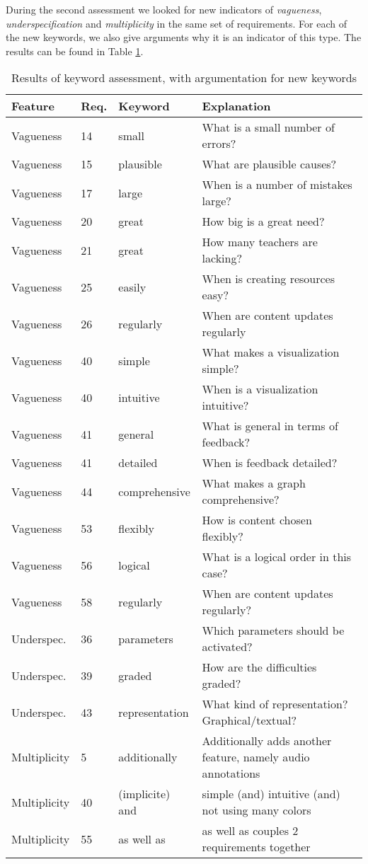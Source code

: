 \documentclass[a4paper,11pt]{article}
\begin{document}
			During the second assessment we looked for new indicators of \textit{vagueness}, \textit{underspecification} and \textit{multiplicity} in the same set of requirements. For each of the new keywords, we also give arguments why it is an indicator of this type. The results can be found in Table \ref{table:keywords2}. \\
			
			\begin{table}[h!]
				\begin{tabular}{l | l | l | p{7cm}}
					Feature & Req. & Keyword & Explanation \\ \hline
					Vagueness & 14 & small & What is a small number of errors? \\
					Vagueness & 15 & plausible & What are plausible causes? \\
					Vagueness & 17 & large & When is a number of mistakes large? \\
					Vagueness & 20 & great & How big is a great need? \\
					Vagueness & 21 & great & How many teachers are lacking? \\
					Vagueness & 25 & easily & When is creating resources easy? \\
					Vagueness & 26 & regularly & When are content updates regularly \\
					Vagueness & 40 & simple & What makes a visualization simple? \\
					Vagueness & 40 & intuitive & When is a visualization intuitive? \\
					Vagueness & 41 & general & What is general in terms of feedback? \\
					Vagueness & 41 & detailed & When is feedback detailed? \\
					Vagueness & 44 & comprehensive & What makes a graph comprehensive? \\
					Vagueness & 53 & flexibly & How is content chosen flexibly? \\
					Vagueness & 56 & logical & What is a logical order in this case? \\
					Vagueness & 58 & regularly & When are content updates regularly? \\
					Underspec. & 36 & parameters & Which parameters should be activated? \\
					Underspec. & 39 & graded & How are the difficulties graded? \\
					Underspec. & 43 & representation & What kind of representation? Graphical/textual? \\
					Multiplicity & 5 & additionally & Additionally adds another feature, namely audio annotations \\
					Multiplicity & 40 & (implicite) and & simple (and) intuitive (and) not using many colors \\
					Multiplicity & 55 & as well as & as well as couples 2 requirements together \\
				\end{tabular}
				\caption{Results of keyword assessment, with argumentation for new keywords}
				\label{table:keywords2}
			\end{table}
\end{document}
